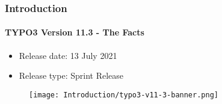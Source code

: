 %

\begin{frame}[fragile]
	\frametitle{Introduction}
	\framesubtitle{TYPO3 Version 11.3 - The Facts}

	\begin{itemize}
		\item Release date: 13 July 2021
		\item Release type: Sprint Release
	\end{itemize}

	\begin{figure}
		\texttt{[image: Introduction/typo3-v11-3-banner.png]}
	\end{figure}

\end{frame}


